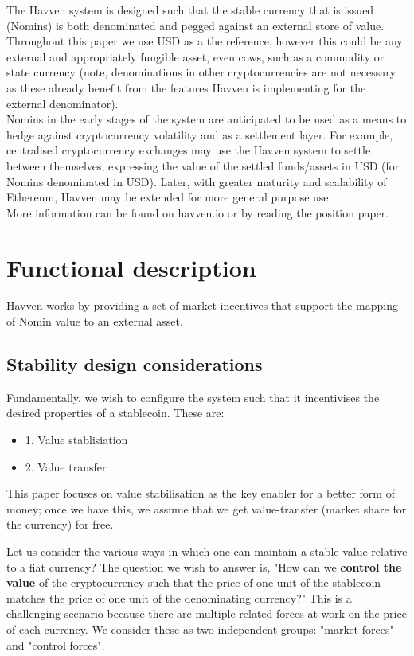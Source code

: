 \documentclass{article}
\begin{document}
\noindent The Havven system is designed such that the stable currency that is issued (Nomins) is both denominated and pegged against an external store of value. Throughout this paper we use USD as a the reference, however this could be any external and appropriately fungible asset, even cows, such as a commodity or state currency (note, denominations in other cryptocurrencies are not necessary as these already benefit from the features Havven is implementing for the external denominator). \\

\noindent Nomins in the early stages of the system are anticipated to be used as a means to hedge against cryptocurrency volatility and as a settlement layer. For example, centralised cryptocurrency exchanges may use the Havven system to settle between themselves, expressing the value of the settled funds/assets in USD (for Nomins denominated in USD). Later, with greater maturity and scalability of Ethereum, Havven may be extended for more general purpose use. \\

\noindent More information can be found on havven.io or by reading the position paper.

\pagebreak
\section{Functional description}

Havven works by providing a set of market incentives that support the mapping of Nomin value to an external asset.

\subsection{Stability design considerations}

Fundamentally, we wish to configure the system such that it incentivises the desired properties of a stablecoin. These are:
\begin{itemize}
    \item 1. Value stablisiation
    \item 2. Value transfer
\end{itemize}

This paper focuses on value stabilisation as the key enabler for a better form of money; once we have this, we assume that we get value-transfer (market share for the currency) for free.


Let us consider the various ways in which one can maintain a stable value relative to a fiat currency? The question we wish to answer is, "How can we \textbf{control the value} of the cryptocurrency such that the price of one unit of the stablecoin matches the price of one unit of the denominating currency?" This is a challenging scenario because there are multiple related forces at work on the price of each currency. We consider these as two independent groups: "market forces" and "control forces". \\
\end{document}
